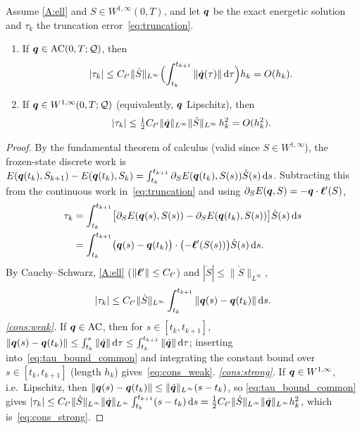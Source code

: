 \begin{proposition}\label{prop:consistency}
Assume \ref{A:ell} and $S\in W^{1,\infty}(0,T)$, and let $\bm{q}$ be the
exact energetic solution and $\tau_k$ the truncation
error~\eqref{eq:truncation}.
\begin{enumerate}[label=\textnormal{(\roman*)},leftmargin=2.4em,itemsep=2pt]
  \item\label{cons:weak} If $\bm{q}\in\mathrm{AC}(0,T;\mathcal{Q})$, then
  \begin{equation}\label{eq:cons_weak}
    |\tau_k|\le C_{\ell'}\|\dot S\|_{L^\infty}\Bigl(\int_{t_k}^{t_{k+1}}\|\dot{\bm{q}}(\tau)\|\mathop{}\!\mathrm{d}\tau\Bigr)h_k=O(h_k).
  \end{equation}
  \item\label{cons:strong} If $\bm{q}\in W^{1,\infty}(0,T;\mathcal{Q})$
  \textnormal{(}equivalently, $\bm{q}$ Lipschitz\textnormal{)}, then
  \begin{equation}\label{eq:cons_strong}
    |\tau_k|\le\tfrac12 C_{\ell'}\|\dot{\bm{q}}\|_{L^\infty}\|\dot S\|_{L^\infty}\,h_k^2=O(h_k^2).
  \end{equation}
\end{enumerate}
\end{proposition}

\begin{proof}
By the fundamental theorem of calculus (valid since
$S\in W^{1,\infty}$), the frozen-state discrete work is
$E(\bm{q}(t_k),S_{k+1})-E(\bm{q}(t_k),S_k)=\int_{t_k}^{t_{k+1}}\partial_S E(\bm{q}(t_k),S(s))\dot S(s)\mathop{}\!\mathrm{d} s$.
Subtracting this from the continuous work in~\eqref{eq:truncation} and
using $\partial_S E(\bm{q},S)=-\bm{q}\cdot\bm{\ell}'(S)$,
\begin{align}
  \tau_k
  &=\int_{t_k}^{t_{k+1}}\bigl[\partial_S E(\bm{q}(s),S(s))-\partial_S E(\bm{q}(t_k),S(s))\bigr]\dot S(s)\mathop{}\!\mathrm{d} s \notag\\
  &=\int_{t_k}^{t_{k+1}}\bigl(\bm{q}(s)-\bm{q}(t_k)\bigr)\cdot\bigl(-\bm{\ell}'(S(s))\bigr)\dot S(s)\mathop{}\!\mathrm{d} s . \label{eq:tau_repr}
\end{align}
By Cauchy--Schwarz, \ref{A:ell} ($\|\bm{\ell}'\|\le C_{\ell'}$) and
$|\dot S|\le\|\dot S\|_{L^\infty}$,
\begin{equation}\label{eq:tau_bound_common}
  |\tau_k|\le C_{\ell'}\|\dot S\|_{L^\infty}\int_{t_k}^{t_{k+1}}\|\bm{q}(s)-\bm{q}(t_k)\|\mathop{}\!\mathrm{d} s .
\end{equation}
\emph{\ref{cons:weak}.} If $\bm{q}\in\mathrm{AC}$, then for
$s\in[t_k,t_{k+1}]$, $\|\bm{q}(s)-\bm{q}(t_k)\|\le\int_{t_k}^{s}\|\dot{\bm{q}}\|\mathop{}\!\mathrm{d}\tau\le\int_{t_k}^{t_{k+1}}\|\dot{\bm{q}}\|\mathop{}\!\mathrm{d}\tau$;
inserting into~\eqref{eq:tau_bound_common} and integrating the constant
bound over $s\in[t_k,t_{k+1}]$ (length $h_k$) gives~\eqref{eq:cons_weak}.
\emph{\ref{cons:strong}.} If $\bm{q}\in W^{1,\infty}$, i.e.\ Lipschitz,
then $\|\bm{q}(s)-\bm{q}(t_k)\|\le\|\dot{\bm{q}}\|_{L^\infty}(s-t_k)$, so
\eqref{eq:tau_bound_common} gives
$|\tau_k|\le C_{\ell'}\|\dot S\|_{L^\infty}\|\dot{\bm{q}}\|_{L^\infty}\int_{t_k}^{t_{k+1}}(s-t_k)\mathop{}\!\mathrm{d} s
=\tfrac12 C_{\ell'}\|\dot S\|_{L^\infty}\|\dot{\bm{q}}\|_{L^\infty}h_k^2$,
which is~\eqref{eq:cons_strong}.
\end{proof}

